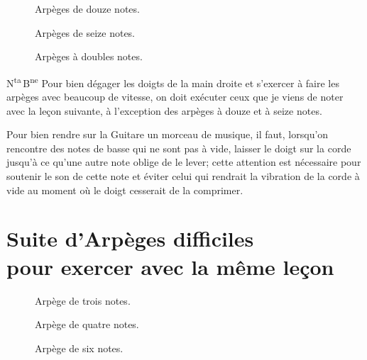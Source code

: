 \documentclass[a4paper]{book}
\begin{document}
\begin{figure}[H]
  \centering
  \begin{minipage}{4.4in}
    \caption{Arpèges de douze notes.}
  \end{minipage}
\end{figure}

\begin{figure}[H]
  \centering
  \begin{minipage}{5.6in}
    \caption{Arpèges de seize notes.}
  \end{minipage}
\end{figure}

\begin{figure}[H]
  \centering
  \begin{minipage}{6in}
    \caption{Arpèges à doubles notes.}
  \end{minipage}
\end{figure}

N\textsuperscript{ta}\,B\textsuperscript{ne}
Pour bien dégager les doigts de la main droite et s'exercer à faire les arpèges avec beaucoup de vitesse, on doit exécuter ceux que je viens de noter avec la leçon suivante, à l'exception des arpèges à douze et à seize notes.

Pour bien rendre sur la Guitare un morceau de musique, il faut, lorsqu'on rencontre des notes de basse qui ne sont pas à vide, laisser le doigt sur la corde jusqu'à ce qu'une autre note oblige de le lever; cette attention est nécessaire pour soutenir le son de cette note et éviter celui qui rendrait la vibration de la corde à vide au moment où le doigt cesserait de la comprimer.

\begin{figure}[h]
  \centering
\end{figure}

\section*{\Large Suite d'Arpèges difficiles\\[-1.5ex]
  pour exercer avec la même leçon}

\begin{figure}[H]
  \centering
  \begin{minipage}{1.8in}
    \caption{Arpège de trois notes.}
  \end{minipage}
  \hfill
  \begin{minipage}{1.9in}
    \caption{Arpège de quatre notes.}
  \end{minipage}
  \hfill
  \begin{minipage}{2.1in}
    \caption{Arpège de six notes.}
  \end{minipage}
\end{figure}
\end{document}
